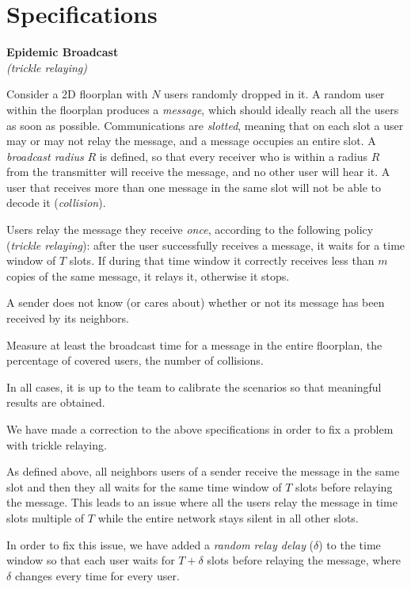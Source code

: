 \chapter{Specifications}\label{ch:specs}

\begin{center}
	\Large \textbf{Epidemic Broadcast}\\
	\normalsize \textit{(trickle relaying)}
\end{center}

Consider a 2D floorplan with \(N\) users randomly dropped in it. A random user
within the floorplan produces a \emph{message}, which should ideally reach all
the users as soon as possible. Communications are \emph{slotted}, meaning that
on each slot a user may or may not relay the message, and a message occupies an
entire slot. A \emph{broadcast radius} \(R\) is defined, so that every receiver
who is within a radius \(R\) from the transmitter will receive the message, and
no other user will hear it. A user that receives more than one message in the
same slot will not be able to decode it (\emph{collision}).

Users relay the message they receive \emph{once}, according to the following
policy (\emph{trickle relaying}): after the user successfully receives a
message, it waits for a time window of \(T\) slots. If during that time window
it correctly receives less than \(m\) copies of the same message, it relays it,
otherwise it stops.

A sender does not know (or cares about) whether or not its message has been
received by its neighbors.

Measure at least the broadcast time for a message in the entire floorplan, the
percentage of covered users, the number of collisions.

In all cases, it is up to the team to calibrate the scenarios so that meaningful
results are obtained.

\begin{tcolorbox}[title=Note]
	We have made a correction to the above specifications in order to fix a
	problem with trickle relaying.

	As defined above, all neighbors users of a sender receive the message in
	the same slot and then they all waits for the same time window of \(T\)
	slots before relaying the message. This leads to an issue where all the
	users relay the message in time slots multiple of \(T\) while the entire
	network stays silent in all other slots.

	In order to fix this issue, we have added a \emph{random relay delay}
	(\(\delta\)) to the time window so that each user waits for \(T+\delta\)
	slots before relaying the message, where \(\delta\) changes every time
	for every user.
\end{tcolorbox}
